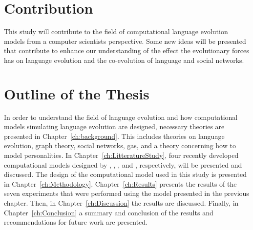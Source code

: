 \begin{comment}
    \section{Objectives}
    The objectives of this thesis are:
    
    \begin{centering}
        \begin{enumerate}
            \item Investigate the state-of-the-art within the field of simulating language using computational models. The computational models' strengths and weaknesses are discussed.
            \item The computational model presented in \citet{lekvam2014co} will be extended in an attempt to learn more about how the evolutionary forces affect language evolution.
            \item The computational model will continue the trend of simulating the co-evolution of language and social networks.  
        \end{enumerate}
    \end{centering}
\end{comment}

\section{Contribution}
This study will contribute to the field of computational language evolution models from a computer scientists perspective. Some new ideas will be presented that contribute to enhance our understanding of the effect the evolutionary forces has on language evolution and the co-evolution of language and social networks.

\section{Outline of the Thesis}
In order to understand the field of language evolution and how computational models simulating language evolution are designed, necessary theories are presented in Chapter~\ref{ch:background}. This includes theories on language evolution, graph theory, social networks, \acp{ga}, and a theory concerning how to model personalities. In Chapter~\ref{ch:LitteratureStudy}, four recently developed computational models designed by \citeauthor{gong2011simulating}, \citeauthor{lipowska2011naming}, \citeauthor{lekvam2014co}, and \citeauthor{munroe2002learning}, respectively, will be presented and discussed. The design of the computational model used in this study is presented in Chapter~\ref{ch:Methodology}. Chapter~\ref{ch:Results} presents the results of the seven experiments that were performed using the model presented in the previous chapter. Then, in Chapter~\ref{ch:Discussion} the results are discussed. Finally, in Chapter~\ref{ch:Conclusion} a summary and conclusion of the results and recommendations for future work are presented.      


